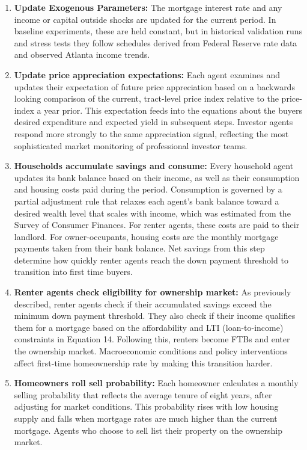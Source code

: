 \documentclass[twocolumn,showpacs,%
  nofootinbib,aps,superscriptaddress,%
  eqsecnum,prd,notitlepage,showkeys,10pt]{revtex4-1}
\begin{document}
\begin{enumerate}
    \item \textbf{Update Exogenous Parameters:} The mortgage interest rate and any income or capital outside shocks are updated for the current period. In baseline experiments, these are held constant, but in historical validation runs and stress tests they follow schedules derived from Federal Reserve rate data and observed Atlanta income trends.

    \item \textbf{Update price appreciation expectations:} Each agent examines and updates their expectation of future price appreciation based on a backwards looking comparison of the current, tract-level price index relative to the price-index a year prior. This expectation feeds into the equations about the buyers desired expenditure and expected yield in subsequent steps. Investor agents respond more strongly to the same appreciation signal, reflecting the most sophisticated market monitoring of professional investor teams. 

    \item \textbf{Households accumulate savings and consume: } Every household agent updates its bank balance based on their income, as well as their consumption and housing costs paid during the period. Consumption is governed by a partial adjustment rule that relaxes each agent's bank balance toward a desired wealth level that scales with income, which was estimated from the Survey of Consumer Finances. For renter agents, these costs are paid to their landlord. For owner-occupants, housing costs are the monthly mortgage payments taken from their bank balance. Net savings from this step determine how quickly renter agents reach the down payment threshold to transition into first time buyers. 

    \item \textbf{Renter agents check eligibility for ownership market:} As previously described, renter agents check if their accumulated savings exceed the minimum down payment threshold. They also check if their income qualifies them for a mortgage based on the affordability and LTI (loan-to-income) constraints in Equation 14. Following this, renters become FTBs and enter the ownership market. Macroeconomic conditions and policy interventions affect first-time homeownership rate by making this transition harder. 

    \item \textbf{Homeowners roll sell probability:} Each homeowner calculates a monthly selling probability that reflects the average tenure of eight years, after adjusting for market conditions. This probability rises with low housing supply and falls when mortgage rates are much higher than the current mortgage. Agents who choose to sell list their property on the ownership market. 


\end{enumerate}
\end{document}

